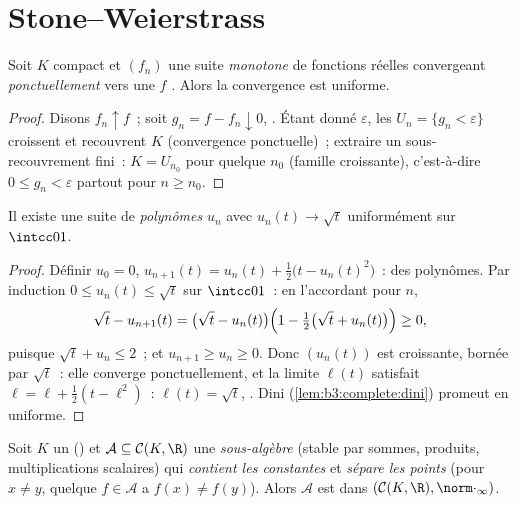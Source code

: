 \section{Stone--Weierstrass}

\begin{lemma}[Dini]\label{lem:b3:complete:dini}
Soit $K$ compact et $(f_n)$ une suite \emph{monotone} de
fonctions réelles  convergeant \emph{ponctuellement}
vers une $f$ . Alors la convergence est
uniforme.
\end{lemma}

\begin{proof}
Disons $f_n \uparrow f$~; soit $g_n = f - f_n \downarrow 0$,
. Étant donné $\varepsilon$, les  $U_n =
\{g_n < \varepsilon\}$ croissent et recouvrent $K$
(convergence ponctuelle)~; extraire un sous-recouvrement
fini~: $K = U_{n_0}$ pour quelque $n_0$ (famille croissante),
c'est-à-dire $0 \leq g_n < \varepsilon$ partout pour $n \geq
n_0$.
\end{proof}

\begin{lemma}\label{lem:b3:complete:sqrt}
Il existe une suite de \emph{polynômes} $u_n$ avec $u_n(t) \to
\sqrt t$ uniformément sur $\intcc01$.
\end{lemma}

\begin{proof}
Définir $u_0 = 0$, $u_{n+1}(t) = u_n(t) + \frac12\bigl(t -
u_n(t)^2\bigr)$~: des polynômes. Par induction $0 \leq u_n(t)
\leq \sqrt t$ sur $\intcc01$~: en l'accordant pour $n$,
\[
\sqrt t - u_{n+1}(t) = \bigl(\sqrt t - u_n(t)\bigr)
\Bigl(1 - \tfrac12\bigl(\sqrt t + u_n(t)\bigr)\Bigr) \geq 0,
\]
puisque $\sqrt t + u_n \leq 2$~; et $u_{n+1} \geq u_n \geq 0$.
Donc $(u_n(t))$ est croissante, bornée par $\sqrt t$~: elle
converge ponctuellement, et la limite $\ell(t)$ satisfait $\ell
= \ell + \frac12(t - \ell^2)$~: $\ell(t) = \sqrt t$, .
Dini (\cref{lem:b3:complete:dini}) promeut en uniforme.
\end{proof}

\begin{theorem}
\label{thm:b3:complete:stoneweierstrass}
Soit $K$ un  () et $\mathcal A \subseteq
\mathcal C(K, \R)$ une \emph{sous-algèbre} (stable par sommes,
produits, multiplications scalaires) qui \emph{contient les
constantes} et \emph{sépare les points} (pour $x \neq y$,
quelque $f \in \mathcal A$ a $f(x) \neq f(y)$). Alors $\mathcal
A$ est  dans $(\mathcal C(K,\R), \norm\cdot_\infty)$.%
\end{theorem}


